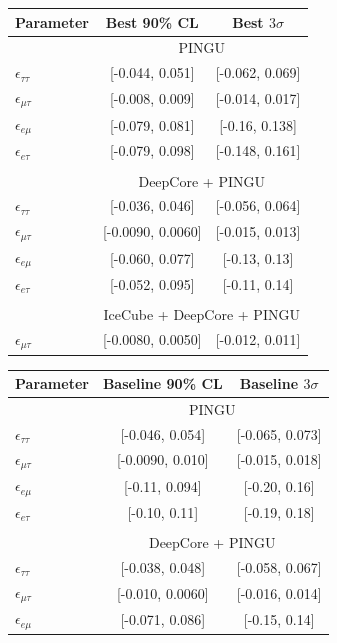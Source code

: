 \documentclass{article}
\newcommand{\emt}{\ensuremath{\epsilon_{\mu\tau}}}
\newcommand{\eet}{\epsilon_{e\tau}}
\newcommand{\eem}{\epsilon_{e\mu}}
\newcommand{\ett}{\ensuremath{\epsilon_{\tau\tau}}}
\begin{document}
{{ \begin{table}
    \centering
    \begin{tabular}{lcc}
       \hline
       Parameter & Best 90\% CL & Best $3\sigma$\\
       \hline & \multicolumn{2}{c}{PINGU} \\
       $\ett$ &  [-0.044, 0.051] &  [-0.062, 0.069] \\
       $\emt$ &  [-0.008, 0.009] &  [-0.014, 0.017] \\
       $\eem$ &  [-0.079, 0.081] &   [-0.16, 0.138] \\
       $\eet$ &  [-0.079, 0.098] &  [-0.148, 0.161] \\\\
       & \multicolumn{2}{c}{DeepCore + PINGU} \\
       $\ett$ &  [-0.036, 0.046] &  [-0.056, 0.064] \\
       $\emt$ &  [-0.0090, 0.0060] &  [-0.015, 0.013] \\
       $\eem$ &   [-0.060, 0.077] &  [-0.13, 0.13] \\
       $\eet$ &  [-0.052, 0.095] &  [-0.11, 0.14] \\\\
       & \multicolumn{2}{c}{IceCube + DeepCore + PINGU}  \\
       $\emt$ &  [-0.0080, 0.0050] &  [-0.012, 0.011] \\
       \hline
    \end{tabular}
    \begin{tabular}{lcc}
       \hline 
       Parameter & Baseline 90\% CL & Baseline $3\sigma$\\
       \hline & \multicolumn{2}{c}{PINGU} \\
       $\ett$ &  [-0.046, 0.054] &  [-0.065, 0.073] \\
       $\emt$ &   [-0.0090, 0.010] &  [-0.015, 0.018] \\
       $\eem$ &  [-0.11, 0.094] &  [-0.20, 0.16] \\
       $\eet$ &   [-0.10, 0.11] &  [-0.19, 0.18] \\\\
       & \multicolumn{2}{c}{DeepCore + PINGU} \\
       $\ett$ &    [-0.038, 0.048] &  [-0.058, 0.067] \\
       $\emt$ &    [-0.010, 0.0060] &  [-0.016, 0.014] \\
       $\eem$ &    [-0.071, 0.086] &  [-0.15, 0.14]  \\

\end{tabular}
\end{table}}}
\end{document}
